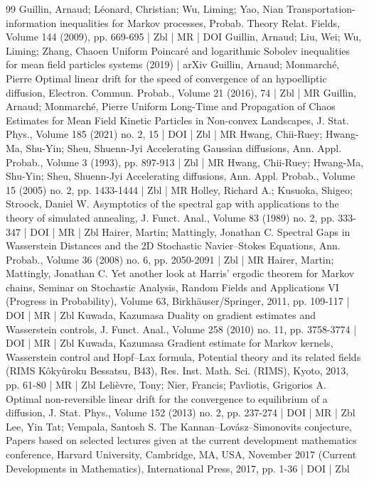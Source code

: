 \documentclass[10pt]{amsart}
\theoremstyle{definition}\newtheorem{defi}[theo]{Definition}\newtheorem{rema}[theo]{Remark}\newtheorem{exam}[theo]{Example}\newtheorem{exem}[theo]{Example}\newtheorem{nota}[theo]{Notation}
\newcommand{\1}{\mathbbm{1}}
\begin{document}
\begin{thebibliography}{99}
 Guillin, Arnaud; Léonard, Christian; Wu, Liming; Yao, Nian Transportation-information inequalities for Markov processes, Probab. Theory Relat. Fields, Volume 144 (2009), pp. 669-695 | Zbl | MR | DOI
 Guillin, Arnaud; Liu, Wei; Wu, Liming; Zhang, Chaoen Uniform Poincaré and logarithmic Sobolev inequalities for mean field particles systems (2019) | arXiv
 Guillin, Arnaud; Monmarché, Pierre Optimal linear drift for the speed of convergence of an hypoelliptic diffusion, Electron. Commun. Probab., Volume 21 (2016), 74 | Zbl | MR
 Guillin, Arnaud; Monmarché, Pierre Uniform Long-Time and Propagation of Chaos Estimates for Mean Field Kinetic Particles in Non-convex Landscapes, J. Stat. Phys., Volume 185 (2021) no. 2, 15 | DOI | Zbl | MR
 Hwang, Chii-Ruey; Hwang-Ma, Shu-Yin; Sheu, Shuenn-Jyi Accelerating Gaussian diffusions, Ann. Appl. Probab., Volume 3 (1993), pp. 897-913 | Zbl | MR
 Hwang, Chii-Ruey; Hwang-Ma, Shu-Yin; Sheu, Shuenn-Jyi Accelerating diffusions, Ann. Appl. Probab., Volume 15 (2005) no. 2, pp. 1433-1444 | Zbl | MR
 Holley, Richard A.; Kusuoka, Shigeo; Stroock, Daniel W. Asymptotics of the spectral gap with applications to the theory of simulated annealing, J. Funct. Anal., Volume 83 (1989) no. 2, pp. 333-347 | DOI | MR | Zbl
 Hairer, Martin; Mattingly, Jonathan C. Spectral Gaps in Wasserstein Distances and the 2D Stochastic Navier–Stokes Equations, Ann. Probab., Volume 36 (2008) no. 6, pp. 2050-2091 | Zbl | MR
 Hairer, Martin; Mattingly, Jonathan C. Yet another look at Harris’ ergodic theorem for Markov chains, Seminar on Stochastic Analysis, Random Fields and Applications VI (Progress in Probability), Volume 63, Birkhäuser/Springer, 2011, pp. 109-117 | DOI | MR | Zbl
 Kuwada, Kazumasa Duality on gradient estimates and Wasserstein controls, J. Funct. Anal., Volume 258 (2010) no. 11, pp. 3758-3774 | DOI | MR | Zbl
 Kuwada, Kazumasa Gradient estimate for Markov kernels, Wasserstein control and Hopf–Lax formula, Potential theory and its related fields (RIMS Kôkyûroku Bessatsu, B43), Res. Inst. Math. Sci. (RIMS), Kyoto, 2013, pp. 61-80 | MR | Zbl
 Lelièvre, Tony; Nier, Francis; Pavliotis, Grigorios A. Optimal non-reversible linear drift for the convergence to equilibrium of a diffusion, J. Stat. Phys., Volume 152 (2013) no. 2, pp. 237-274 | DOI | MR | Zbl
 Lee, Yin Tat; Vempala, Santosh S. The Kannan–Lovász–Simonovits conjecture, Papers based on selected lectures given at the current development mathematics conference, Harvard University, Cambridge, MA, USA, November 2017 (Current Developments in Mathematics), International Press, 2017, pp. 1-36 | DOI | Zbl

\end{thebibliography}
\end{document}
